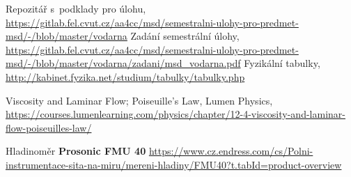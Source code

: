 \documentclass[conference]{IEEEtran}
\begin{document}
    
\begin{thebibliography}{9}


        Repozitář s~podklady pro úlohu, \url{https://gitlab.fel.cvut.cz/aa4cc/msd/semestralni-ulohy-pro-predmet-msd/-/blob/master/vodarna}
    Zadání semestrální úlohy, \url{https://gitlab.fel.cvut.cz/aa4cc/msd/semestralni-ulohy-pro-predmet-msd/-/blob/master/vodarna/zadani/msd_vodarna.pdf}
    Fyzikální tabulky, \url{http://kabinet.fyzika.net/studium/tabulky/tabulky.php}

    Viscosity and Laminar Flow; Poiseuille's Law, Lumen Physics, \url{https://courses.lumenlearning.com/physics/chapter/12-4-viscosity-and-laminar-flow-poiseuilles-law/}
    
    Hladinoměr \textbf{Prosonic FMU 40} \url{https://www.cz.endress.com/cs/Polni-instrumentace-sita-na-miru/mereni-hladiny/FMU40?t.tabId=product-overview}

    
    \end{thebibliography}
    
\end{document}
